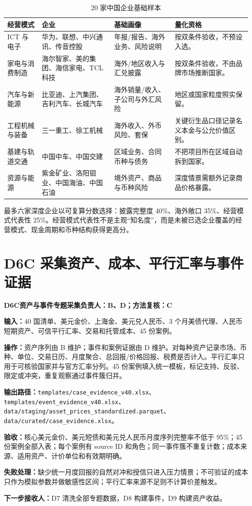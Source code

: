 \documentclass[UTF8,fontset=windows,12pt,openany]{ctexbook}
\newcommand{\File}[1]{{\small\nolinkurl{#1}}}
\newcommand{\StepTitle}[3]{%
  \noindent\colorbox{DeepNavy}{\parbox{0.965\textwidth}{\color{white}\Large\bfseries #1\quad #2\hfill\normalsize #3}}\par\medskip
}
\newcommand{\CardRow}[2]{\noindent\textbf{#1：}#2\par}
\begin{document}
\begin{longtable}{p{3.4cm}p{3.8cm}p{3.0cm}p{3.0cm}}
\caption{20 家中国企业基础样本}\label{tab:companies}\\
\toprule
\textbf{经营模式} & \textbf{企业} & \textbf{基础画像} & \textbf{量化资格}\\
\midrule
ICT 与电子 & 华为、联想、中兴通讯、传音控股 & 年报/报告、海外业务、风险说明 & 按双条件验收，不预设入选。\\
家电与消费制造 & 海尔智家、美的集团、海信家电、TCL 科技 & 海外/地区收入与汇兑披露 & 按双条件验收，不由品牌市场推断国家。\\
汽车与新能源 & 比亚迪、上汽集团、吉利汽车、长城汽车 & 海外销量/收入、子公司与外汇风险 & 地区或国家粒度照实保留。\\
工程机械与装备 & 三一重工、徐工机械 & 海外收入、外币风险、套保 & 关键衍生品口径记录名义本金与公允价值区别。\\
基建与轨道交通 & 中国中车、中国交建 & 区域业务、合同币种与债务 & 不把项目所在区域自动拆到国家。\\
资源与能源 & 紫金矿业、洛阳钼业、中国海油、中国石油 & 境外资产、商品与币种风险 & 深度情景需额外记录商品价格暴露。\\
\bottomrule
\end{longtable}

最多六家深度企业以可复算分数选择：披露完整度 40\%、海外敞口 35\%、经营模式代表性 25\%。经营模式代表性不是主观“知名度”，而是未被已选企业覆盖的经营模式、现金周期和币种结构获得更高分。

\newpage
\section{D6C 采集资产、成本、平行汇率与事件证据}
\StepTitle{D6C}{资产与事件专题采集}{负责人：B、D；方法复核：C}
\CardRow{输入}{40 国清单、美元金价、上海金、美元兑人民币、3 个月美债代理、人民币短期资产、可信平行汇率、交易和托管成本、45 份案例。}
\CardRow{操作}{资产序列由 B 维护；事件和案例证据由 D 维护。对每种资产记录市场、币种、单位、交易日历、月度聚合、总回报/价格回报、税费是否计入。平行汇率只用于可核验国家并与官方汇率分列。45 份案例填入统一模板，标记支持、反驳、限定或冲突，重复观察通过事件簇归并。}
\CardRow{输出路径}{\File{templates/case_evidence_v40.xlsx}、\File{templates/event_evidence_v40.xlsx}、\File{data/staging/asset_prices_standardized.parquet}、\File{data/curated/case_evidence.xlsx}。}
\CardRow{验收}{核心美元金价、美元短债和美元兑人民币月度序列完整率不低于 95\%；45 份案例全部入表；每个案例有 source ID 和角色；同一事件簇不重复计数；成本来源、适用资产、计价单位和有效期明确。}
\CardRow{失败处理}{缺少统一月度回报的自然对冲和授信只进入压力情景；不可验证的成本只作为模拟参数并做敏感性区间；平行汇率来源不足则不计算价差触发。}
\CardRow{下一步接收人}{D7 清洗全部专题数据，D8 构建事件，D9 构建资产收益。}
\end{document}
